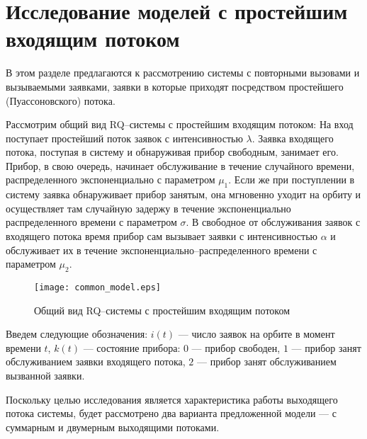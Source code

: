 \section {Исследование моделей с простейшим входящим потоком}
В этом разделе предлагаются к рассмотрению системы с повторными вызовами и вызываемыми заявками, заявки в которые приходят посредством простейшего (Пуассоновского) потока.

Рассмотрим общий вид RQ--системы с простейшим входящим потоком:
На вход поступает простейший поток заявок с интенсивностью $\lambda$. Заявка входящего потока, поступая в систему и обнаруживая прибор свободным, занимает его. Прибор, в свою очередь, начинает обслуживание в течение случайного времени, распределенного экспоненциально с параметром $\mu_{1}$. Если же при поступлении в систему заявка обнаруживает прибор занятым, она мгновенно уходит на орбиту и осуществляет там случайную задержу в течение экспоненциально распределенного времени с параметром $\sigma$. В свободное от обслуживания заявок с входящего потока время прибор сам вызывает заявки с интенсивностью $\alpha$ и обслуживает их в течение экспоненциально--распределенного времени с параметром $\mu_{2}$.
\begin{figure}[H]
	\centering
	\texttt{[image: common\_model.eps]}
	\caption{Общий вид RQ--системы с простейшим входящим потоком}
	\label{common_model_fig}
\end{figure}
Введем следующие обозначения: $i(t)$ --- число заявок на орбите в момент времени $t$, $k(t)$ --- состояние прибора: $0$ --- прибор свободен, $1$ --- прибор занят обслуживанием заявки входящего потока, $2$ --- прибор занят обслуживанием вызванной заявки. 
 
Поскольку целью исследования является характеристика работы выходящего потока системы, будет рассмотрено два варианта предложенной модели --- с суммарным и двумерным выходящими потоками.



